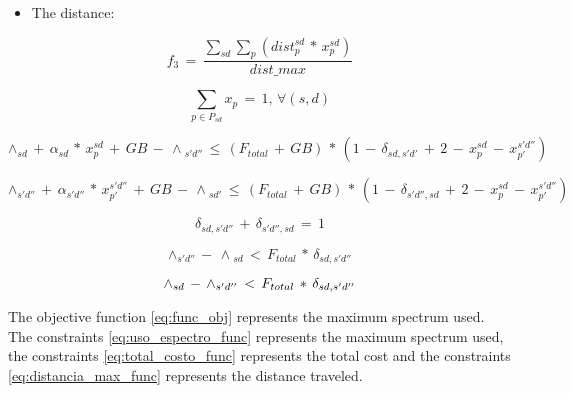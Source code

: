 \phantom{}
\begin{itemize}
\item The distance:
\end{itemize}
\begin{equation}
f_{3}\,=\,\frac{\sum_{sd}\sum_{p}\left(dist_{p}^{sd}\,*\,x_{p}^{sd}\right)}{dist\_max}\label{eq:distancia_max_func}
\end{equation}

\phantom{}

\begin{equation}
\sum_{p\in P_{sd}}x_{p}\,=\,1,\,\forall\left(s,d\right)\label{eq:restriccion1}
\end{equation}

\phantom{}

\begin{equation}
\wedge{}_{sd}\,+\,\alpha_{sd}\,*\,x_{p}^{sd}\,+\,GB\,-\,\wedge{}_{s'd''}\,\leq\,\left(F_{total}\,+\,GB\right)\,*\,\left(1\,-\,\delta_{sd,s'd'}\,+\,2\,-\,x_{p}^{sd}\,-\,x_{p'}^{s'd''}\right)\label{eq:restriccion2}
\end{equation}

\phantom{}

\begin{equation}
\wedge{}_{s'd''}\,+\,\alpha_{s'd''}\,*\,x_{p'}^{s'd''}\,+\,GB\,-\,\wedge{}_{sd'}\,\leq\,\left(F_{total}\,+\,GB\right)\,*\,\left(1\,-\,\delta_{s'd'',sd}\,+\,2\,-\,x_{p}^{sd}\,-\,x_{p'}^{s'd''}\right)\label{eq:restriccion3}
\end{equation}

\phantom{}

\begin{equation}
\delta_{sd,s'd''}\,+\,\delta_{s'd'',sd}\,=\,1\label{eq:restriccion4_func}
\end{equation}

\phantom{}

\begin{equation}
\wedge{}_{s'd''}\,-\,\wedge{}_{sd}\,<\,F_{total}\,*\,\delta_{sd,s'd''}\label{eq:restriccion5_func}
\end{equation}

\begin{equation}
\wedge{}_{sd}\,-\,\wedge{}_{s'd''}\,<\,F_{total}\,*\text{\,}\delta_{sd,s'd''}\label{eq:restriccion6_func}
\end{equation}

\phantom{}

The objective function \ref{eq:func_obj} represents the maximum spectrum
used. The constraints \ref{eq:uso_espectro_func} represents the maximum
spectrum used, the constraints \ref{eq:total_costo_func} represents
the total cost and the constraints \ref{eq:distancia_max_func} represents
the distance traveled.

